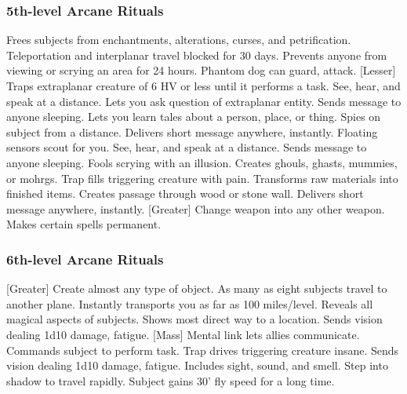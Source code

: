 \subsubsection{5th-level Arcane Rituals}
\begin{rituallist}
     Frees subjects from enchantments, alterations, curses, and petrification.
     Teleportation and interplanar travel blocked for 30 days.
     Prevents anyone from viewing or scrying an area for 24 hours.
     Phantom dog can guard, attack.
    [Lesser] Traps extraplanar creature of 6 HV or less until it performs a task.
     See, hear, and speak at a distance.
     Lets you ask question of extraplanar entity.
     Sends message to anyone sleeping.
    \F Lets you learn tales about a person, place, or thing.
    \F Spies on subject from a distance.
     Delivers short message anywhere, instantly.
     Floating sensors scout for you.
     See, hear, and speak at a distance.
     Sends message to anyone sleeping.
     Fools scrying with an illusion.
     Creates ghouls, ghasts, mummies, or mohrgs.
     Trap fills triggering creature with pain.
     Transforms raw materials into finished items.
     Creates passage through wood or stone wall.
     Delivers short message anywhere, instantly.
    [Greater] Change weapon into any other weapon.
     Makes certain spells permanent.
\end{rituallist}

\subsubsection{6th-level Arcane Rituals}
\begin{rituallist}
    [Greater] Create almost any type of object.
    \F As many as eight subjects travel to another plane.
     Instantly transports you as far as 100 miles/level.
      Reveals all magical aspects of subjects.
     Shows most direct way to a location.
     Sends vision dealing 1d10 damage, fatigue.
    [Mass] Mental link lets allies communicate.
     Commands subject to perform task.
     Trap drives triggering creature insane.
     Sends vision dealing 1d10 damage, fatigue.
     Includes sight, sound, and smell.
     Step into shadow to travel rapidly.
     Subject gains 30' fly speed for a long time.
\end{rituallist}

